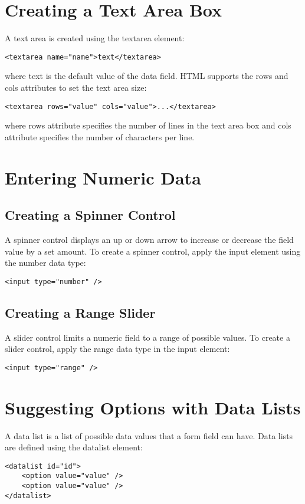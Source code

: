 \documentclass{article}
\begin{document}
\section{Creating a Text Area Box}
A text area is created using the textarea element:
\begin{lstlisting}
<textarea name="name">text</textarea>
\end{lstlisting}
where text is the default value of the data field. HTML supports the rows and cols attributes to set the text area size:
\begin{lstlisting}
<textarea rows="value" cols="value">...</textarea>
\end{lstlisting}
where rows attribute specifies the number of lines in the text area box and cols attribute specifies the number of characters per line.

\section{Entering Numeric Data}
\subsection{Creating a Spinner Control}
A spinner control displays an up or down arrow to increase or decrease the field value by a set amount. To create a spinner control, apply the input element using the number data type:
\begin{lstlisting}
<input type="number" />
\end{lstlisting}

\subsection{Creating a Range Slider}
A slider control limits a numeric field to a range of possible values. To create a slider control, apply the range data type in the input element:
\begin{lstlisting}
<input type="range" />
\end{lstlisting}

\section{Suggesting Options with Data Lists}
A data list is a list of possible data values that a form field can have. Data lists are defined using the datalist element:
\begin{lstlisting}
<datalist id="id">
    <option value="value" />
    <option value="value" />
</datalist>
\end{lstlisting}
\end{document}
